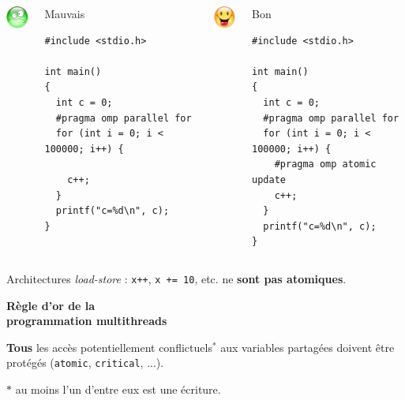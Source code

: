 \documentclass[xcolor={x11names,svgnames},x11names,svgnames]{beamer}
\begin{document}

\begin{frame}[fragile]

  \begin{columns}[t]
  \column{5.5cm}
  \centering\includegraphics[width=1cm]{triste.png}

  \begin{block}{Mauvais}
\begin{verbatim}
#include <stdio.h>
  
int main()
{
  int c = 0;
  #pragma omp parallel for
  for (int i = 0; i < 100000; i++) { 

    c++; 
  }
  printf("c=%d\n", c);
}
\end{verbatim}
\end{block}
    
    
    \column{5.5cm}
    \centering\includegraphics[width=1cm]{content.png}

  \begin{block}{Bon}
\begin{verbatim}
#include <stdio.h>
  
int main()
{
  int c = 0;
  #pragma omp parallel for
  for (int i = 0; i < 100000; i++) { 
    #pragma omp atomic update
    c++; 
  }
  printf("c=%d\n", c);
}
\end{verbatim}
\end{block}
  \end{columns}

  \begin{alertblock}{Architectures \emph{load-store} :}
    \texttt{x++}, \texttt{x += 10}, etc. ne \textbf{sont pas atomiques}.
  \end{alertblock}

\end{frame}


\begin{frame}[label=golden_rule]

  \begin{center}
    \Huge \bf \alert{Règle d'or de la \\ programmation multithreads}
  \end{center}

  \bigskip
  
  {\Large \textbf{Tous} les accès potentiellement conflictuels${}^*$ aux variables partagées doivent être protégés (\texttt{atomic}, \texttt{critical}, ...).}

  \bigskip

  $*$ au moins l'un d'entre eux est une écriture.  
\end{frame}
\end{document}
